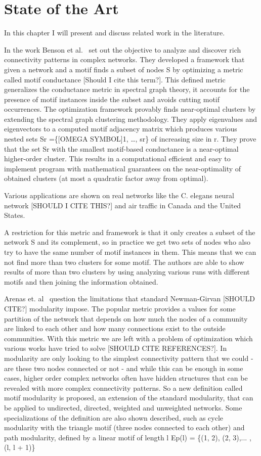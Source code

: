 \chapter{State of the Art}\label{chap:stat}


In this chapter I will present and discuss related work in the literature.

In the work Benson et al.~\cite{Benson2016} set out the objective to analyze and discover rich connectivity patterns in complex networks. They developed a framework that given a network and a motif finds a subset of nodes S by optimizing a metric called motif conductance [Should I cite this term?]. This defined metric generalizes the conductance metric in spectral graph theory, it accounts for the presence of motif instances inside the subset and avoids cutting motif occurrences. The optimization framework provably finds near-optimal clusters by extending the spectral graph clustering methodology. They apply eigenvalues and eigenvectors to a computed motif adjacency matrix which produces various nested sets Sr =\{[OMEGA SYMBOL]1, …, sr\} of increasing size in r. They  prove that the set Sr with the smallest motif-based conductance is a near-optimal higher-order cluster. This results in a computational efficient and easy to implement program with mathematical guarantees on the near-optimality of obtained clusters (at most a quadratic factor away from optimal).

Various applications are shown on real networks like the C. elegans neural network [SHOULD I CITE THIS?] and air traffic in Canada and the United States.

A restriction for this metric and framework is that it only creates a subset of the network S and its complement, so in practice we get two sets of nodes who also try to have the same number of motif instances in them. This means that we can not find more than two clusters for some motif. The authors are able to show results of more than two clusters by using analyzing various runs with different motifs and then joining the information obtained. 


Arenas et. al~\cite{Arenas2008} question the limitations that standard Newman-Girvan [SHOULD CITE?] modularity impose. The popular metric provides a values for some partition of the network that depends on how much the nodes of a community are linked to each other and how many connections exist to the outside communities. With this metric we are left with a problem of optimization which various works have tried to solve [SHOULD CITE REFERENCES?]. In modularity are only looking to the simplest connectivity pattern that we could - are these two nodes connected or not - and while this can be enough in some cases, higher order complex networks often have hidden structures that can be revealed with more complex connectivity patterns. So a new definition called motif modularity is proposed, an extension of the standard modularity, that can be applied to undirected, directed, weighted and unweighted networks. Some specializations of the definition are also shown described, such as cycle modularity with the triangle motif (three nodes connected to each other) and path modularity, defined by a linear motif of length l Ep(l) = \{(1, 2), (2, 3),... , (l, l + 1)\} 

